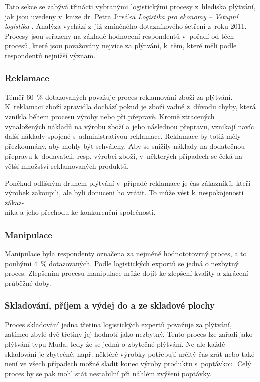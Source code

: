Tato sekce se zabývá třinácti vybranými logistickými procesy z~hlediska plýtvání, jak jsou uvedeny v~knize dr. Petra Jirsáka \emph{Logistika pro ekonomy -- Vstupní logistika} \cite{bib:Jirsak}. Analýza vychází z~již zmíněného dotazníkového šetření z~roku 2011. Procesy jsou seřazeny na základě hodnocení respondentů v~pořadí od těch procesů, které jsou považovány nejvíce za plýtvání, k~těm, které měli podle respondentů nejnižší význam.
 
\subsubsection*{Reklamace}

Téměř 60~\% dotazovaných považuje proces reklamování zboží za plýtvání. K~reklamaci zboží zpravidla dochází pokud je zboží vadné z~důvodu chyby, která vznikla během procesu výroby nebo při přepravě. Kromě ztracených vynaložených nákladů na výrobu zboží a jeho následnou přepravu, vznikají navíc další náklady spojené s~administrativou reklamace. Reklamace by totiž měly přezkoumány, aby mohly být schváleny. Aby se snížily náklady na dodatečnou přepravu k~dodavateli, resp. výrobci zboží, v~některých případech se čeká na větší množství reklamovaných produktů.

Poněkud odlišným druhem plýtvání v~případě reklamace je čas zákazníků, kteří výrobek zakoupili, ale byli donuceni ho vrátit. To může vést k~nespokojenosti zákaz-\\níka a jeho přechodu ke konkurenční společnosti.

\subsubsection*{Manipulace}

Manipulace byla respondenty označena za nejméně hodnototovrný proces, a to pouhými 4~\% dotazovaných. Podle logistických exportů se jedná o nezbytný proces. Zlepšením procesu manipulace může dojít ke zlepšení kvality a zkrácení průběžné doby.

\subsubsection*{Skladování, příjem a výdej do a ze skladové plochy}

Proces skladování jedna třetina logistických expertů považuje za plýtvání, zatímco zbylé dvě třetiny jej hodnotí jako nezbytný. Tento proces lze zařadi jako plýtvání typu Muda, tedy že se jedná o zbytečné plýtvání. Ne ale každé skladování je zbytečné, např. něktěré výrobky potřebují určitý čas zrát nebo také není ve všech případech možné sladit konec výroby produktu s~poptávkou. Celý proces by se pak mohl stát nestabilní při náhlém zvýšení poptávky.        

